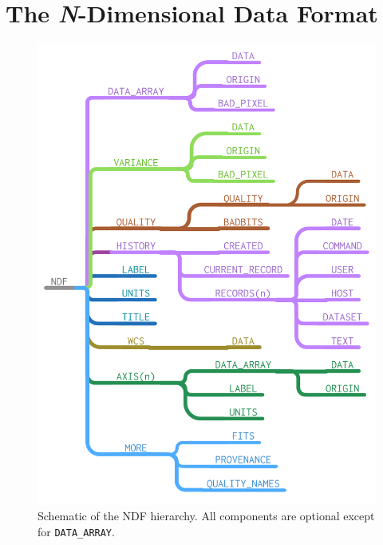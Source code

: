 \documentclass[final,authoryear,5p,times,twocolumn]{elsarticle}
\begin{document}
\section{The \emph{N}-Dimensional Data Format}
\label{sec:ndf}

\begin{figure}[t]
\includegraphics[width=\columnwidth]{NDF-structure}
\caption{Schematic of the NDF hierarchy. All components are optional
  except for \texttt{DATA\_ARRAY}.}
\label{fig:ndf-structure}
\end{figure}
\end{document}
